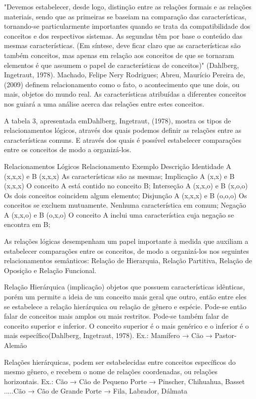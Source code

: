 "Devemos estabelecer, desde logo, distinção entre as relações formais e as relações materiais, sendo que as primeiras se baseiam na comparação das características, tornando-se particularmente importantes quando se trata da compatibilidade dos conceitos e dos respectivos sistemas. As segundas têm por base o conteúdo das mesmas características. (Em síntese, deve ficar claro que as características são também conceitos, mas apenas em relação aos conceitos de que se tornaram elementos é que assumem o papel de características de conceitos)" (Dahlberg, Ingetraut, 1978).
Machado, Felipe Nery Rodrigues; Abreu, Maurício Pereira de, (2009) definem relacionamento como o fato, o acontecimento que une dois, ou mais, objetos do mundo real. As características atribuídas a diferentes conceitos nos guiará a uma análise acerca das relações entre estes conceitos.

A tabela 3, apresentada emDahlberg, Ingetraut, (1978), mostra os tipos de relacionamentos lógicos, através dos quais podemos definir as relações entre as características comuns. E através dos quais é possível estabelecer comparações entre os conceitos de modo a organizá-los.

Relacionamentos Lógicos
Relacionamento	Exemplo	Descrição
Identidade	A (x,x,x) e B (x,x,x)	As características são as mesmas;
Implicação	A (x,x) e B (x,x,x)	O conceito A está contido no conceito B;
Interseção	A (x,x,o) e B (x,o,o)	Os dois conceitos coincidem algum elemento;
Disjunção	A (x,x,x) e B (o,o,o)	Os conceitos se excluem mutuamente. Nenhuma característica em comum;
Negação	A (x,x,o) e B (o,x,o)	
O conceito A inclui uma característica cuja negação se encontra em B;

As relações lógicas desempenham um papel importante à medida que auxiliam a estabelecer comparações entre os conceitos, de modo a organizá-los nos seguintes relacionamentos semânticos: Relação de Hierarquia, Relação Partitiva, Relação de Oposição e Relação Funcional.

Relação Hierárquica (implicação) objetos que possuem características idênticas, porém um permite a ideia de um conceito mais geral que outro, então entre eles se estabelece a relação hierárquica ou relação de gênero e espécie. Pode-se então falar de conceitos mais amplos ou mais restritos. Pode-se também falar de conceito superior e inferior. O conceito superior é o mais genérico e o inferior é o mais específico(Dahlberg, Ingetraut, 1978).
Ex.: Mamífero → Cão → Pastor-Alemão

Relações hierárquicas, podem ser estabelecidas entre conceitos específicos do mesmo gênero, e recebem o nome de relações coordenadas, ou relações horizontais.
Ex.: Cão → Cão de Pequeno Porte → Pinscher, Chihuahua, Basset
.....Cão → Cão de Grande Porte → Fila, Labrador, Dálmata

